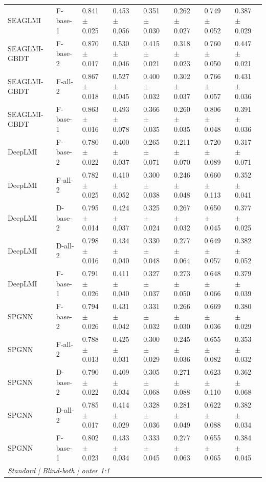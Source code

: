 \begin{landscape}
{\begin{longtable}{llllllll}
SEAGLMI & F-base-1 & 0.841 $\pm$ 0.025 & 0.453 $\pm$ 0.056 & 0.351 $\pm$ 0.030 & 0.262 $\pm$ 0.027 & 0.749 $\pm$ 0.052 & 0.387 $\pm$ 0.029 \\
SEAGLMI-GBDT & F-base-2 & 0.870 $\pm$ 0.017 & 0.530 $\pm$ 0.046 & 0.415 $\pm$ 0.021 & 0.318 $\pm$ 0.023 & 0.760 $\pm$ 0.050 & 0.447 $\pm$ 0.021 \\
SEAGLMI-GBDT & F-all-2 & 0.867 $\pm$ 0.018 & 0.527 $\pm$ 0.045 & 0.400 $\pm$ 0.032 & 0.302 $\pm$ 0.037 & 0.766 $\pm$ 0.057 & 0.431 $\pm$ 0.036 \\
SEAGLMI-GBDT & F-base-1 & 0.863 $\pm$ 0.016 & 0.493 $\pm$ 0.078 & 0.366 $\pm$ 0.035 & 0.260 $\pm$ 0.035 & 0.806 $\pm$ 0.048 & 0.391 $\pm$ 0.036 \\
DeepLMI & F-base-2 & 0.780 $\pm$ 0.022 & 0.400 $\pm$ 0.037 & 0.265 $\pm$ 0.071 & 0.211 $\pm$ 0.070 & 0.720 $\pm$ 0.089 & 0.317 $\pm$ 0.071 \\
DeepLMI & F-all-2 & 0.782 $\pm$ 0.025 & 0.410 $\pm$ 0.052 & 0.300 $\pm$ 0.038 & 0.246 $\pm$ 0.048 & 0.660 $\pm$ 0.113 & 0.352 $\pm$ 0.041 \\
DeepLMI & D-base-2 & 0.795 $\pm$ 0.014 & 0.424 $\pm$ 0.037 & 0.325 $\pm$ 0.024 & 0.267 $\pm$ 0.032 & 0.650 $\pm$ 0.045 & 0.377 $\pm$ 0.025 \\
DeepLMI & D-all-2 & 0.798 $\pm$ 0.016 & 0.434 $\pm$ 0.040 & 0.330 $\pm$ 0.048 & 0.277 $\pm$ 0.064 & 0.649 $\pm$ 0.057 & 0.382 $\pm$ 0.052 \\
DeepLMI & F-base-1 & 0.791 $\pm$ 0.026 & 0.411 $\pm$ 0.040 & 0.327 $\pm$ 0.037 & 0.273 $\pm$ 0.050 & 0.648 $\pm$ 0.066 & 0.379 $\pm$ 0.039 \\
SPGNN & F-base-2 & 0.794 $\pm$ 0.026 & 0.431 $\pm$ 0.042 & 0.331 $\pm$ 0.032 & 0.266 $\pm$ 0.030 & 0.669 $\pm$ 0.036 & 0.380 $\pm$ 0.029 \\
SPGNN & F-all-2 & 0.788 $\pm$ 0.013 & 0.425 $\pm$ 0.031 & 0.300 $\pm$ 0.029 & 0.245 $\pm$ 0.036 & 0.655 $\pm$ 0.082 & 0.353 $\pm$ 0.032 \\
SPGNN & D-base-2 & 0.790 $\pm$ 0.022 & 0.409 $\pm$ 0.034 & 0.305 $\pm$ 0.068 & 0.271 $\pm$ 0.088 & 0.623 $\pm$ 0.110 & 0.362 $\pm$ 0.068 \\
SPGNN & D-all-2 & 0.785 $\pm$ 0.017 & 0.414 $\pm$ 0.029 & 0.328 $\pm$ 0.036 & 0.281 $\pm$ 0.049 & 0.622 $\pm$ 0.088 & 0.382 $\pm$ 0.034 \\
SPGNN & F-base-1 & 0.802 $\pm$ 0.023 & 0.433 $\pm$ 0.034 & 0.333 $\pm$ 0.045 & 0.277 $\pm$ 0.063 & 0.655 $\pm$ 0.065 & 0.384 $\pm$ 0.045 \\
\multicolumn{8}{l}{\textit{Standard | Blind-both | outer 1:1}}\\

\end{longtable}}
\end{landscape}
